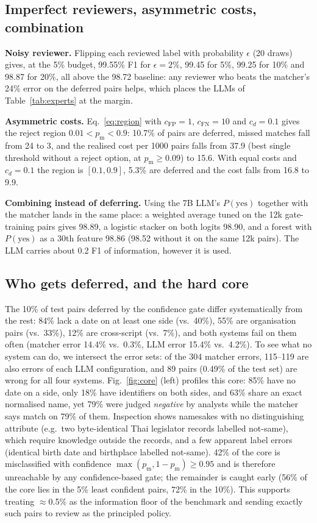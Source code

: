 \documentclass[conference]{IEEEtran}
\newcommand{\pyes}{p_{\mathrm{m}}}
\begin{document}
\subsection{Imperfect reviewers, asymmetric costs, combination}
\textbf{Noisy reviewer.} Flipping each reviewed label with probability $\epsilon$ (20 draws) gives, at the 5\% budget, 99.55\% F1 for $\epsilon=2\%$, 99.45 for 5\%, 99.25 for 10\% and 98.87 for 20\%, all above the 98.72 baseline: any reviewer who beats the matcher's 24\% error on the deferred pairs helps, which places the LLMs of Table~\ref{tab:experts} at the margin.

\textbf{Asymmetric costs.} Eq.~\eqref{eq:region} with $c_{\mathrm{FP}}=1$, $c_{\mathrm{FN}}=10$ and $c_d=0.1$ gives the reject region $0.01<\pyes<0.9$: 10.7\% of pairs are deferred, missed matches fall from 24 to 3, and the realised cost per 1000 pairs falls from 37.9 (best single threshold without a reject option, at $\pyes\ge0.09$) to 15.6. With equal costs and $c_d=0.1$ the region is $[0.1,0.9]$, 5.3\% are deferred and the cost falls from 16.8 to 9.9.

\textbf{Combining instead of deferring.} Using the 7B LLM's $P(\text{yes})$ together with the matcher lands in the same place: a weighted average tuned on the 12k gate-training pairs gives 98.89, a logistic stacker on both logits 98.90, and a forest with $P(\text{yes})$ as a 30th feature 98.86 (98.52 without it on the same 12k pairs). The LLM carries about 0.2 F1 of information, however it is used.

\subsection{Who gets deferred, and the hard core}\label{sec:core}
The 10\% of test pairs deferred by the confidence gate differ systematically from the rest: 84\% lack a date on at least one side (vs.\ 40\%), 55\% are organisation pairs (vs.\ 33\%), 12\% are cross-script (vs.\ 7\%), and both systems fail on them often (matcher error 14.4\% vs.\ 0.3\%, LLM error 15.4\% vs.\ 4.2\%). To see what no system can do, we intersect the error sets: of the 304 matcher errors, 115--119 are also errors of each LLM configuration, and 89 pairs (0.49\% of the test set) are wrong for all four systems. Fig.~\ref{fig:core} (left) profiles this core: 85\% have no date on a side, only 18\% have identifiers on both sides, and 63\% share an exact normalised name, yet 79\% were judged \emph{negative} by analysts while the matcher says match on 79\% of them. Inspection shows namesakes with no distinguishing attribute (e.g.\ two byte-identical Thai legislator records labelled not-same), which require knowledge outside the records, and a few apparent label errors (identical birth date and birthplace labelled not-same). 42\% of the core is misclassified with confidence $\max(\pyes,1-\pyes)\ge0.95$ and is therefore unreachable by any confidence-based gate; the remainder is caught early (56\% of the core lies in the 5\% least confident pairs, 72\% in the 10\%). This supports treating $\approx$0.5\% as the information floor of the benchmark and sending exactly such pairs to review as the principled policy.
\end{document}
